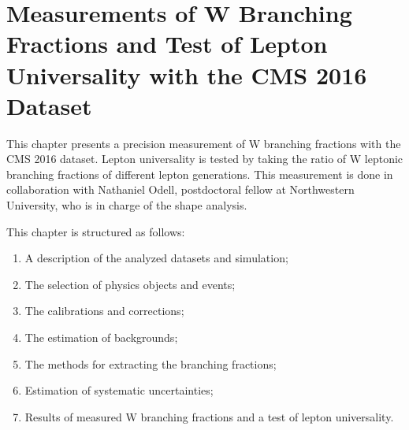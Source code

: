 \chapter{Measurements of W Branching Fractions and Test of Lepton Universality with the CMS 2016 Dataset}
\label{sec:analysis}


This chapter presents a precision measurement of W branching fractions with the CMS 2016 dataset. Lepton universality is tested by taking the ratio of W leptonic branching fractions of different lepton generations. This measurement is done in collaboration with Nathaniel Odell, postdoctoral fellow at Northwestern University, who is in charge of the shape analysis. 


This chapter is structured as follows:

\begin{enumerate}
    \item A description of the analyzed datasets and simulation;
    \item The selection of physics objects and events;
    \item The calibrations and corrections;
    \item The estimation of backgrounds;
    \item The methods for extracting the branching fractions;
    \item Estimation of systematic uncertainties;
    \item Results of measured W branching fractions and a test of lepton universality.
\end{enumerate}
    
    
% 
% 
% 
% 
% 
% 






